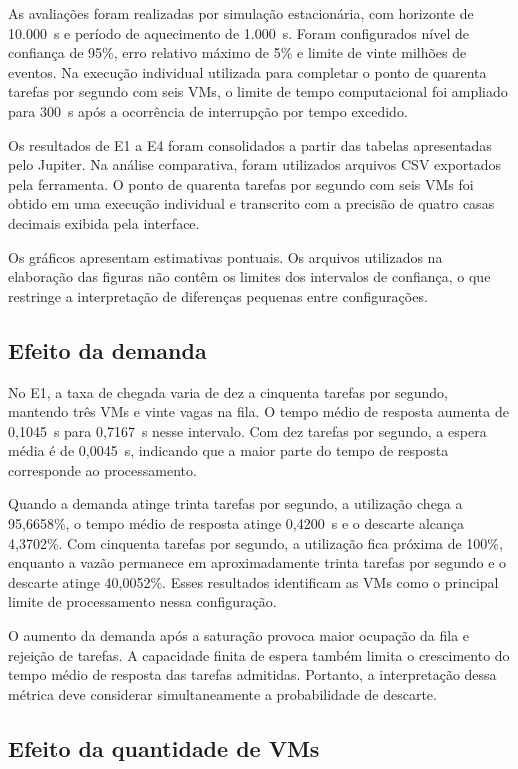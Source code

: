 \documentclass[conference]{IEEEtran}
\begin{document}
As avaliações foram realizadas por simulação estacionária,
com horizonte de 10.000~s e período de aquecimento de
1.000~s. Foram configurados nível de confiança de 95\%,
erro relativo máximo de 5\% e limite de vinte milhões
de eventos. Na execução individual utilizada para completar
o ponto de quarenta tarefas por segundo com seis VMs,
o limite de tempo computacional foi ampliado para
300~s após a ocorrência de interrupção por tempo excedido.

Os resultados de E1 a E4 foram consolidados a partir
das tabelas apresentadas pelo Jupiter. Na análise
comparativa, foram utilizados arquivos CSV exportados
pela ferramenta. O ponto de quarenta tarefas por segundo
com seis VMs foi obtido em uma execução individual e
transcrito com a precisão de quatro casas decimais
exibida pela interface.

Os gráficos apresentam estimativas pontuais. Os arquivos
utilizados na elaboração das figuras não contêm os
limites dos intervalos de confiança, o que restringe a
interpretação de diferenças pequenas entre configurações.

\subsection{Efeito da demanda}

No E1, a taxa de chegada varia de dez a cinquenta tarefas
por segundo, mantendo três VMs e vinte vagas na fila.
O tempo médio de resposta aumenta de 0,1045~s para
0,7167~s nesse intervalo. Com dez tarefas por segundo,
a espera média é de 0,0045~s, indicando que a maior
parte do tempo de resposta corresponde ao processamento.

Quando a demanda atinge trinta tarefas por segundo,
a utilização chega a 95,6658\%, o tempo médio de resposta
atinge 0,4200~s e o descarte alcança 4,3702\%.
Com cinquenta tarefas por segundo, a utilização fica
próxima de 100\%, enquanto a vazão permanece em
aproximadamente trinta tarefas por segundo e o descarte
atinge 40,0052\%. Esses resultados identificam as VMs
como o principal limite de processamento nessa configuração.

O aumento da demanda após a saturação provoca maior
ocupação da fila e rejeição de tarefas. A capacidade
finita de espera também limita o crescimento do tempo
médio de resposta das tarefas admitidas. Portanto,
a interpretação dessa métrica deve considerar
simultaneamente a probabilidade de descarte.

\subsection{Efeito da quantidade de VMs}
\end{document}
